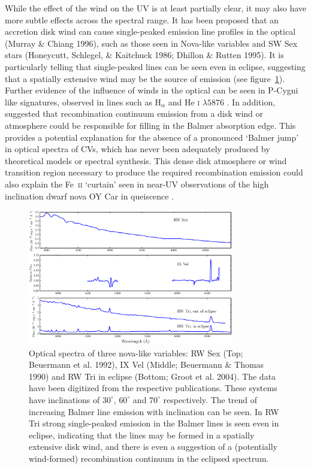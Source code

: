 \documentclass[preprint, a4paper, 11pt]{aastex}
\begin{document}
While the effect of the wind on the UV is at least partially clear, it may also have more subtle 
effects across the spectral range. It has been proposed that an accretion disk wind
can cause single-peaked emission line profiles in the optical (Murray \& Chiang 1996), 
such as those seen in Nova-like variables and SW Sex stars (Honeycutt, Schlegel,
\& Kaitchuck 1986; Dhillon \& Rutten 1995). It is particularly telling that single-peaked 
lines can be seen even in eclipse, suggesting 
that a spatially extensive wind may be the source of emission (see figure~\ref{novalikes}).
Further evidence of the influence of winds in the optical can be seen in P-Cygni like signatures,
observed in lines such as H$_{\alpha}$ and He \textsc{i} $\lambda5876$ \citep{RN98}.
In addition, \cite{KLWB98} suggested
that recombination continuum emission from a disk wind or atmosphere
could be responsible for filling in the Balmer absorption edge. This provides
a potential explanation for
the absence of a pronounced `Balmer jump' in optical spectra of CVs, which has never been adequately produced 
by theoretical models or spectral synthesis.
This dense disk atmosphere or wind transition region
necessary to produce the required recombination emission
could also explain the Fe~\textsc{ii} `curtain'
seen in near-UV observations of the high inclination dwarf nova OY Car in queiscence 
\citep{horne1994}.


\begin{figure}	%
\centering
\includegraphics[width=0.8\textwidth]{figures/fig1.eps}
\caption{Optical spectra of three nova-like variables: 
RW Sex (Top; Beuermann et al. 1992),
IX Vel (Middle; Beuermann \& Thomas 1990)
and RW Tri in eclipse (Bottom; Groot et al. 2004).
The data have been digitized from the respective publications. 
These systems have inclinations of $30^\circ$, $60^\circ$ and $70^\circ$ 
respectively.
The trend of increasing Balmer line emission with inclination can be seen.
In RW Tri strong single-peaked emission in the Balmer lines is seen even
in eclipse, indicating that the lines may be formed in a spatially extensive disk wind, and there is even a suggestion
of a (potentially wind-formed) recombination continuum in the eclipsed spectrum.}
\label{novalikes}
\end{figure}
\end{document}
